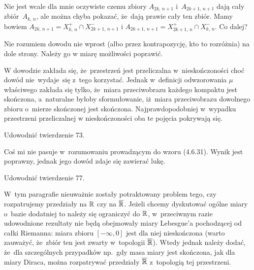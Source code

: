\documentclass[a4paper,11pt]{article}
\begin{document}
\start {} Nie jest wcale dla mnie oczywiste czemu zbiory
$A_{ 2 k,\, n+ 1 }$ i~$A_{ 2 k + 1,\, n+ 1 }$ dają cały
zbiór~$A_{ k,\, n }$, ale można chyba pokazać, że~dają prawie cały ten
zbiór. Mamy bowiem
$A_{ 2 k,\, n + 1 } = X^{ + }_{ k,\, n } \cap X^{ - }_{ 2 k + 1,\, n +
  1 }$ i
$A_{ 2 k + 1,\, n + 1 } = X^{ + }_{ 2 k + 1,\, n } \cap X^{ - }_{ k,\,
  n }$. Co dalej?

\vspace{\spaceFour}


\start {} Nie rozumiem dowodu nie wprost (albo przez
kontrapozycję, kto to rozróżnia) na dole strony. Należy go w miarę
możliwości poprawić.

\vspace{\spaceFour}


\start {} W dowodzie zakłada się, że~przestrzeń jest
przeliczalna w~nieskończoności choć dowód nie~wydaje~się z~tego
korzystać. Jednak w~definicji odwzorowania $\mu$\dywiz właściwego
zakłada się tylko, że~miara przeciwobrazu każdego kompaktu jest
skończona, a~naturalne byłoby sformułowanie, iż~miara przeciwobrazu
dowolnego zbioru o~mierze skończonej jest skończona.
Najprawdopodobniej w~wypadku przestrzeni przeliczalnej w
nieskończoności oba te pojęcia pokrywają się.

\vspace{\spaceFour}


\start {} Udowodnić twierdzenie 73.

\vspace{\spaceFour}


\start {} Coś mi nie pasuje w~rozumowaniu prowadzącym do wzoru
(4.6.31). Wynik jest poprawny, jednak jego dowód zdaje się zawierać
lukę.

\vspace{\spaceFour}


\start {} Udowodnić twierdzenie 77.

\vspace{\spaceFour}


\start {} W~tym paragrafie nieuważnie zostały potraktowany
problem tego, czy rozpatrujemy przedziały na $\mathbb{R}$ czy na
$\overline{\mathbb{R}}$. Jeżeli chcemy dyskutować ogólne miary o~bazie
dodatniej to należy się ograniczyć do $\mathbb{R}$, w~przeciwnym razie
udowodnione rezultaty nie będą obejmowały miary Lebesgue'a pochodzącej
od całki Riemanna: miara zbioru $[ -\infty, 0 ]$ jest dla niej
nieskończona (warto zauważyć, że~zbiór ten jest zwarty w~topologii
$\overline{\mathbb{R}}$). Wtedy jednak należy dodać, że~dla
szczególnych przypadków np.~gdy masa miary jest skończona, jak dla
miary Diraca, można rozpatrywać przedziały $\overline{\mathbb{R}}$
z~topologią tej przestrzeni.
\end{document}
